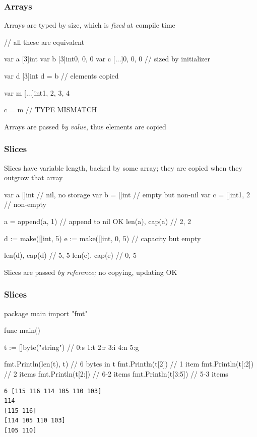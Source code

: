 \documentclass[handout,compress,t,11pt]{beamer}
\begin{document}
\begin{frame}[fragile]
    \frametitle{Arrays}
    Arrays are typed by size, which is {\em fixed} at compile time
\begin{golang}
    // all these are equivalent

    var a [3]int
    var b [3]int{0, 0, 0}
    var c [...]{0, 0, 0}   // sized by initializer
    
    var d [3]int
    d = b                  // elements copied

    var m [...]int{1, 2, 3, 4}

    c = m                  // TYPE MISMATCH
\end{golang}
    \vspace{\baselineskip}
    Arrays are passed {\em by value}, thus elements are copied
\end{frame}

\begin{frame}[fragile]
    \frametitle{Slices}
    Slices have variable length, backed by some array; they are
    copied when they outgrow that array
\begin{golang}
    var a []int             // nil, no storage
    var b = []int{}         // empty but non-nil
    var c = []int{1, 2}     // non-empty

    a = append(a, 1)        // append to nil OK
    len(a), cap(a)          // 2, 2

	d := make([]int, 5)
	e := make([]int, 0, 5)  // capacity but empty

    len(d), cap(d)          // 5, 5
    len(e), cap(e)          // 0, 5
\end{golang}
    \vspace{\baselineskip}
    Slices are passed {\em by reference;} no copying, updating OK
\end{frame}

\begin{frame}[fragile]
    \frametitle{Slices}
\begin{golang}
package main
import "fmt"

func main() {
	t := []byte("string")   // 0:s 1:t 2:r 3:i 4:n 5:g

	fmt.Println(len(t), t)  // 6 bytes in t
	fmt.Println(t[2])       //   1 item
	fmt.Println(t[:2])      //   2 items
	fmt.Println(t[2:])      // 6-2 items
	fmt.Println(t[3:5])     // 5-3 items
}
\end{golang}
{\small\begin{verbatim}
6 [115 116 114 105 110 103]
114
[115 116]
[114 105 110 103]
[105 110]
\end{verbatim}}
\end{frame}
\end{document}
